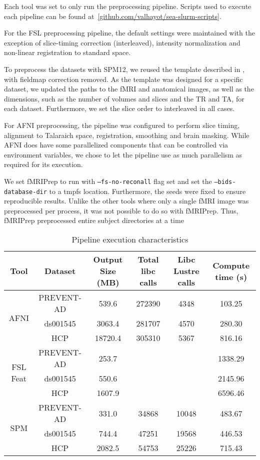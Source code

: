     Each tool was set to only run the preprocessing pipeline. Scripts used to execute each pipeline can be found at~\ref{github.com/valhayot/sea-slurm-scripts}.
    
    For the FSL preprocessing pipeline, the default settings were maintained with the exception of slice-timing correction (interleaved),
    intensity normalization and non-linear registration to standard space.
    
    To preprocess the datasets with SPM12, we reused the template described in \cite{haitas2021}, with fieldmap correction removed.
    As the template was designed for a specific dataset, we updated the paths to the fMRI and anatomical images,
    as well as the dimensions, such as the number of volumes and slices and the TR and TA, for each dataset. Furthermore,
    we set the slice order to interleaved in all cases. 
    
    For AFNI preprocessing, the pipeline was configured to perform slice timing, alignment to Talaraich space, registration, smoothing
    and brain masking. While AFNI does have some parallelized components that can be controlled via environment variables, we chose to let 
    the pipeline use as much parallelism as required for its execution.
    
    We set fMRIPrep to run with \texttt{--fs-no-reconall} flag set and set the \texttt{--bids-database-dir} to a tmpfs location. 
    Furthermore, the seeds were fixed to ensure reproducible results. Unlike the other tools where only a single fMRI image was preprocessed
    per process, it was not possible to do so with fMRIPrep. Thus, fMRIPrep preprocessed entire subject directories at a time
    
    
    \begin{table*}[t]
      \small\centering
    \begin{tabular}{|c c c c c c|}
      \hline
      Tool & Dataset &  Output Size (MB) & Total libc calls & Libc Lustre calls & Compute time (s) \\
      \hline
      \multirow{3}{1em}{AFNI} & PREVENT-AD & 539.6 & 272390 & 4348 & 103.25 \\
      & ds001545 & 3063.4 & 281707 & 4570  & 280.30 \\
      & HCP & 18720.4 & 305310 & 5367 & 816.16 \\
      \hline
      \multirow{3}{1em}{FSL Feat} & PREVENT-AD & 253.7 & &  & 1338.29 \\
      & ds001545 & 550.6 & &  & 2145.96 \\
      & HCP & 1607.9 & & & 6596.46 \\
      \hline
      \multirow{3}{1em}{SPM} & PREVENT-AD & 331.0 & 34868 & 10048 &  483.67 \\
      & ds001545 & 744.4 & 47251 & 19568 & 446.53 \\
      & HCP & 2082.5 & 54753 & 25226 & 715.43 \\
    
      \hline
    \end{tabular}\caption{Pipeline execution characteristics}\label{table:pipelines}
    \end{table*}
